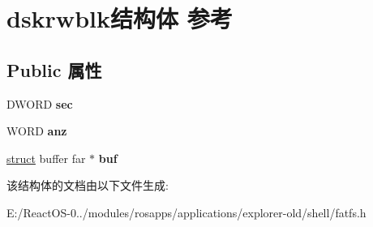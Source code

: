 \hypertarget{structdskrwblk}{}\section{dskrwblk结构体 参考}
\label{structdskrwblk}
\subsection*{Public 属性}
\begin{DoxyCompactItemize}
\item 
\mbox{\label{structdskrwblk_a8dae0da8a0547e84daae68554510091b}} 
D\+W\+O\+RD {\bfseries sec}
\item 
\mbox{\label{structdskrwblk_ad6768b5d0c7cac57e058e68e9e6c2618}} 
W\+O\+RD {\bfseries anz}
\item 
\mbox{\label{structdskrwblk_a4116a7dd577792568e8b30ceacf9cd4f}} 
\hyperlink{interfacestruct}{struct} buffer far $\ast$ {\bfseries buf}
\end{DoxyCompactItemize}


该结构体的文档由以下文件生成\+:\begin{DoxyCompactItemize}
\item 
E\+:/\+React\+O\+S-\/0../modules/rosapps/applications/explorer-\/old/shell/fatfs.\+h\end{DoxyCompactItemize}
